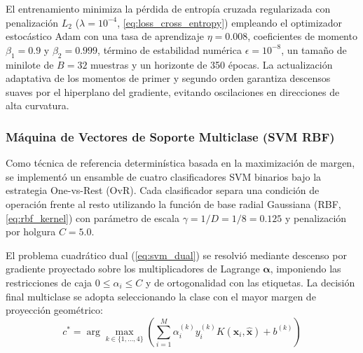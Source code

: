 \documentclass[conference]{IEEEtran}
\begin{document}
El entrenamiento minimiza la pérdida de entropía cruzada regularizada con penalización $L_2$ ($\lambda = 10^{-4}$, \autoref{eq:loss_cross_entropy}) empleando el optimizador estocástico Adam con una tasa de aprendizaje $\eta = 0.008$, coeficientes de momento $\beta_1 = 0.9$ y $\beta_2 = 0.999$, término de estabilidad numérica $\epsilon = 10^{-8}$, un tamaño de minilote de $B = 32$ muestras y un horizonte de 350 épocas. La actualización adaptativa de los momentos de primer y segundo orden garantiza descensos suaves por el hiperplano del gradiente, evitando oscilaciones en direcciones de alta curvatura.

\subsubsection{Máquina de Vectores de Soporte Multiclase (SVM RBF)}
Como técnica de referencia determinística basada en la maximización de margen, se implementó un ensamble de cuatro clasificadores SVM binarios bajo la estrategia One-vs-Rest (OvR). Cada clasificador separa una condición de operación frente al resto utilizando la función de base radial Gaussiana (RBF, \autoref{eq:rbf_kernel}) con parámetro de escala $\gamma = 1/D = 1/8 = 0.125$ y penalización por holgura $C = 5.0$.

El problema cuadrático dual (\autoref{eq:svm_dual}) se resolvió mediante descenso por gradiente proyectado sobre los multiplicadores de Lagrange $\boldsymbol{\alpha}$, imponiendo las restricciones de caja $0 \le \alpha_i \le C$ y de ortogonalidad con las etiquetas. La decisión final multiclase se adopta seleccionando la clase con el mayor margen de proyección geométrico:
\begin{equation}
    c^* = \arg\max_{k \in \{1,\dots,4\}} \left( \sum_{i=1}^M \alpha_i^{(k)} y_i^{(k)} K(\hat{\mathbf{x}}_i, \hat{\mathbf{x}}) + b^{(k)} \right)
    \label{eq:svm_ovr}
\end{equation}
\end{document}
